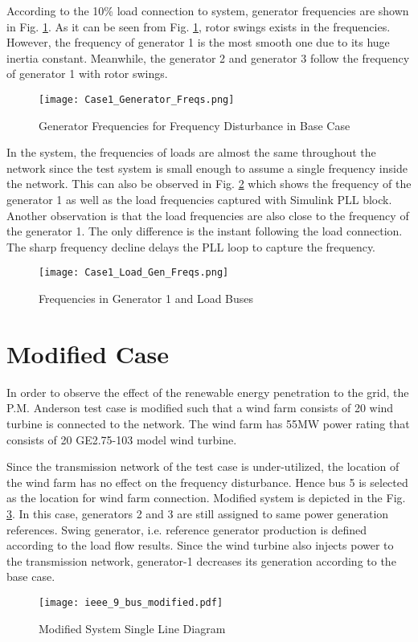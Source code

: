 According to the 10\% load connection to system, generator frequencies are shown in Fig. \ref{genfreqcase1}. As it can be seen from Fig. \ref{genfreqcase1}, rotor swings exists in the frequencies. However, the frequency of generator 1 is the most smooth one due to its huge inertia constant. Meanwhile, the generator 2 and generator 3 follow the frequency of generator 1 with rotor swings.\par
\begin{figure}[h!]
	\centering
	\texttt{[image: Case1\_Generator\_Freqs.png]}
	\caption{Generator Frequencies for Frequency Disturbance in Base Case}
	\label{genfreqcase1}
\end{figure}
In the system, the frequencies of loads are almost the same throughout the network since the test system is small enough to assume a single frequency inside the network. This can also be observed in Fig. \ref{genfreqcase1_loadgen} which shows the frequency of the generator 1 as well as the load frequencies captured with Simulink PLL block. Another observation is that the load frequencies are also close to the frequency of the generator 1. The only difference is the instant following the load connection. The sharp frequency decline delays the PLL loop to capture the frequency. 
\begin{figure}[h!]
	\centering
	\texttt{[image: Case1\_Load\_Gen\_Freqs.png]}
	\caption{Frequencies in Generator 1 and Load Buses}
	\label{genfreqcase1_loadgen}
\end{figure}
\section{Modified Case}
\label{sec:kmodified}
In order to observe the effect of the renewable energy penetration to the grid, the P.M. Anderson test case is modified such that a wind farm consists of 20 wind turbine is connected to the network. The wind farm has 55MW power rating that consists of 20 GE2.75-103 model wind turbine. \par 
Since the transmission network of the test case is under-utilized, the location of the wind farm has no effect on the frequency disturbance. Hence bus 5 is selected as the location for wind farm connection. Modified system is depicted in the Fig. \ref{ieee_9_bus_case2}. In this case, generators 2 and 3 are still assigned to same power generation references. Swing generator, i.e. reference generator production is defined according to the load flow results. Since the wind turbine also injects power to the transmission network, generator-1 decreases its generation according to the base case.
\begin{figure}[h!]
	\centering
	\texttt{[image: ieee\_9\_bus\_modified.pdf]}
	\caption{Modified System Single Line Diagram}
	\label{ieee_9_bus_case2}
\end{figure}
